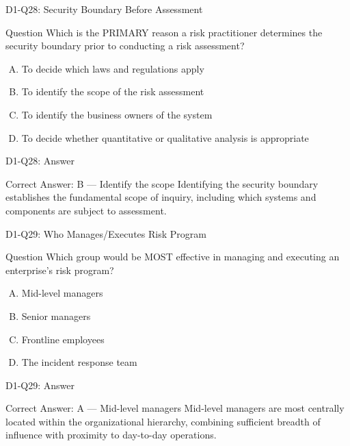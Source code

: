\documentclass{beamer}
\begin{document}
	\begin{frame}{D1-Q28: Security Boundary Before Assessment}
		\begin{block}{Question}
			Which is the PRIMARY reason a risk practitioner determines the security boundary prior to conducting a risk assessment?
		\end{block}
		\begin{enumerate}[(A)]
			\item To decide which laws and regulations apply
			\item To identify the scope of the risk assessment
			\item To identify the business owners of the system
			\item To decide whether quantitative or qualitative analysis is appropriate
		\end{enumerate}
	\end{frame}
	\begin{frame}{D1-Q28: Answer}
		\begin{block}{Correct Answer: B --- Identify the scope}
			Identifying the security boundary establishes the fundamental scope of inquiry, including which systems and components are subject to assessment.
		\end{block}
	\end{frame}
	
	\begin{frame}{D1-Q29: Who Manages/Executes Risk Program}
		\begin{block}{Question}
			Which group would be MOST effective in managing and executing an enterprise's risk program?
		\end{block}
		\begin{enumerate}[(A)]
			\item Mid-level managers
			\item Senior managers
			\item Frontline employees
			\item The incident response team
		\end{enumerate}
	\end{frame}
	\begin{frame}{D1-Q29: Answer}
		\begin{block}{Correct Answer: A --- Mid-level managers}
			Mid-level managers are most centrally located within the organizational hierarchy, combining sufficient breadth of influence with proximity to day-to-day operations.
		\end{block}
	\end{frame}
	
\end{document}
